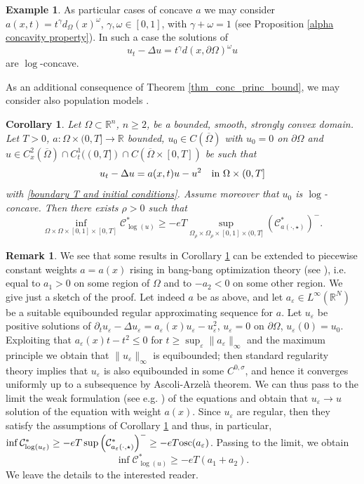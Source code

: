 \documentclass[11pt, reqno]{amsart}
\newtheorem{corollary}[lemma]{Corollary}
\theoremstyle{definition}
\newtheorem{remark}[lemma]{Remark}
\newtheorem{example}[lemma]{Example}
\numberwithin{equation}{section}
\newcommand{\Omegabar}{\overline{\Omega}}
\newcommand{\R}{\mathbb{R}}
\newcommand{\mc}[1]{\mathcal{#1}}
\newcommand{\osc}{{\rm osc}}
\def\eps{\varepsilon}
\def\norm#1{\|#1\|}
\begin{document}
\begin{example}
As particular cases of concave $a$ we may consider $a(x,t)=t^{\gamma} d_\Omega(x)^\omega $, $\gamma, \omega \in [0,1]$, with $\gamma+\omega=1$ (see Proposition \ref{alpha concavity property}). 
In such a case the solutions of
$$ u_t - \Delta u = t^{\gamma} d(x,\partial \Omega)^{\omega} u$$
are $\log$-concave.
\end{example}

As an additional consequence of Theorem \ref{thm_conc_princ_bound}, we may consider also population models \cite{CaCo89}.
\begin{corollary}
\label{corol_popul_quantit}
	Let $\Omega \subset \R^n$, $n\geq 2$, be a bounded, smooth, strongly convex domain. 
	Let $T>0$, $a\colon\Omega\times(0,T]\to \R$ bounded, $u_0\in C(\Omegabar)$ with $u_0=0$ on $\partial\Omega$ and $u \in C^2_x(\Omegabar) \cap C^1_t((0,T]) \cap C(\Omegabar\times[0,T])$ be such that
$$u_t - \Delta u = a(x, t) u - u^2 \quad \hbox{in $\Omega \times (0,T]$}$$
with \eqref{boundary T and initial conditions}. 
Assume moreover that $u_0$ is $\log$-concave. 
Then there exists $\rho>0$ such that
$$\inf_{\Omega \times \Omega \times [0,1] \times [0,T]} \mc{C}^*_{\log(u)} \geq - e T \sup_{\Omega_{\rho} \times \Omega_{\rho} \times [0,1] \times (0,T]} \left(\mc{C}^*_{a(\cdot, \star) }\right)^-.$$
\end{corollary}

\begin{remark}\label{rem_bangbang}
We see that some results in Corollary \ref{corol_popul_quantit} can be extended to piecewise constant weights $a=a(x)$ rising in bang-bang optimization theory (see \cite[Theorem 3.9]{CaCo89}), i.e. equal to $a_1>0$ on some region of $\Omega$ and to $-a_2<0$ on some other region.
We give just a sketch of the proof. 
Let indeed $a$ be as above, and let $a_{\eps} \in L^{\infty}(\R^N)$ be a suitable equibounded regular approximating sequence for $a$. 
Let $u_{\eps}$ be positive solutions of $\partial_t  u_{\eps} -\Delta u_{\eps} = a_{\eps}(x) u_{\eps} - u_{\eps}^2$, $u_{\eps} =0$ on $\partial \Omega$, $u_{\eps}(0)=u_0$.
Exploiting that $a_{\eps}(x) t -t^2\leq 0$ for $t \geq \sup_{\eps} \norm{a_{\eps}}_{\infty}$ and the maximum principle we obtain that $\norm{u_{\eps}}_{\infty}$ is equibounded; then standard regularity theory implies that $u_{\eps}$ is also equibounded in some $C^{0,\sigma}$, and hence it converges uniformly up to a subsequence by Ascoli-Arzelà theorem. 
We can thus pass to the limit the weak formulation (see e.g. \cite{CazenaveDicksteinEscobedo}) of the equations and obtain that $u_{\eps} \to u$ solution of the equation with weight $a(x)$. 
Since $u_{\eps}$ are regular, then they 
satisfy the assumptions of Corollary \ref{corol_popul_quantit} and thus, in particular, $\inf \mc{C}^*_{\log(u_{\eps})} \geq - e T \sup\left(\mc{C}^*_{ a_{\eps}(\cdot, \star) }\right)^- \geq - eT  \osc(a_{\eps})$. 
 Passing to the limit, we obtain 
 $$\inf \mc{C}^*_{\log(u)} \geq - eT (a_1+a_2).$$
 We leave the details to the interested reader.
\end{remark}
\end{document}
